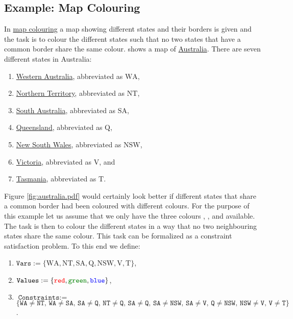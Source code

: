 \subsection{Example: Map Colouring}
In \href{https://en.wikipedia.org/wiki/Four_color_theorem}{map colouring} a map showing different states and their
borders is given and the task is to colour the different states such that no two states that have a common
border share the same colour.   shows a map of
\href{https://en.wikipedia.org/wiki/Australia}{Australia}.  There are seven different 
states in Australia:
\begin{enumerate}
\item \href{https://en.wikipedia.org/wiki/Western_Australia}{Western Australia}, abbreviated as $\mathrm{WA}$,
\item \href{https://en.wikipedia.org/wiki/Northern_Territory}{Northern Territory}, abbreviated as $\mathrm{NT}$,
\item \href{https://en.wikipedia.org/wiki/South_Australia}{South Australia}, abbreviated as $\mathrm{SA}$,
\item \href{https://en.wikipedia.org/wiki/Queensland}{Queensland}, abbreviated as $\mathrm{Q}$,
\item \href{https://en.wikipedia.org/wiki/New_South_Wales}{New South Wales}, abbreviated as $\mathrm{NSW}$,
\item \href{https://en.wikipedia.org/wiki/Victoria_(Australia)}{Victoria}, abbreviated as $\mathrm{V}$, and
\item \href{https://en.wikipedia.org/wiki/Tasmania}{Tasmania}, abbreviated as $\mathrm{T}$.
\end{enumerate}
Figure \ref{fig:australia.pdf} would certainly look better if different states that share a common border had
been coloured with different colours.  For the purpose of 
this example let us assume that we only have the three colours , , and 
available.  The task is then to colour the different 
states in a way that no two neighbouring states share the same colour.  This task can be formalized as a
constraint satisfaction problem.  To this end we define: 
\begin{enumerate}
\item $\texttt{Vars} := \{ \mathrm{WA}, \mathrm{NT}, \mathrm{SA}, \mathrm{Q}, \mathrm{NSW}, \mathrm{V}, \mathrm{T} \}$,
\item $\texttt{Values} := \{ \texttt{\red{red}}, \texttt{\green{green}}, \texttt{\blue{blue}} \}$,
\item $\texttt{Constraints} := $ \\[0.2cm]
      \hspace*{0.8cm}
      $\bigl\{ \texttt{WA} \not= \texttt{NT},\, \texttt{WA} \not= \texttt{SA},\, \texttt{SA} \not= \texttt{Q},\, 
                \texttt{NT} \not= \texttt{Q},\,
                \texttt{SA} \not= \texttt{Q},\, \texttt{SA} \not= \texttt{NSW},\, \texttt{SA} \not= \texttt{V},\,
                \texttt{Q} \not= \texttt{NSW},\, \texttt{NSW} \not= \texttt{V},\, \texttt{V} \not= \texttt{T}
       \bigr\}$.
\end{enumerate}

